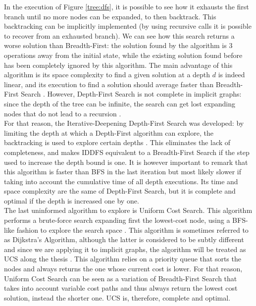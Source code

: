 In the execution of Figure \ref{tree:dfs}, it is possible to see how it
exhausts the first branch until no more nodes can be expanded, to then
backtrack. This backtracking can be implicitly implemented (by using recursive
calls it is possible to recover from an exhausted branch). We can see how this
search returns a worse solution than Breadth-First: the solution found by the
algorithm is 3 operations away from the initial state, while the existing
solution found before has been completely ignored by this algorithm. The main
advantage of this algorithm is its space complexity to find a given solution at
a depth $d$ is indeed linear, and its execution to find a solution should
average faster than Breadth-First Search \cite{zhang-1995-bnb}. However,
Depth-First Search is not complete in implicit graphs: since the depth of the
tree can be infinite, the search can get lost expanding nodes that do not lead
to a recursion \cite{rusell-2003-aima}.\\

For that reason, the Iterative-Deepening Depth-First Search was developed: by
limiting the depth at which a Depth-First algorithm can explore, the
backtracking is used to explore certain depths \cite{rusell-2003-aima}. This
eliminates the lack of completeness, and makes IDDFS equivalent to a
Breadth-First Search if the step used to increase the depth bound is one. It is
however important to remark that this algorithm is faster than BFS in the last
iteration but most likely slower if taking into account the cumulative time of
all depth executions. Its time and space complexity are the same of Depth-First
Search, but it is complete and optimal if the depth is increased one by one.\\

The last uninformed algorithm to explore is Uniform Cost Search. This algorithm
performs a brute-force search expanding first the lowest-cost node, using a
BFS-like fashion to explore the search space \cite{rusell-2003-aima}. This
algorithm is sometimes referred to as Dijkstra's Algorithm, although the latter
is considered to be subtly different and since we are applying it to implicit
graphs, the algorithm will be treated as UCS along the thesis
\cite{felner-2011-dijkstra}. This algorithm relies on a priority queue that
sorts the nodes and always returns the one whose current cost is lower. For
that reason, Uniform Cost Search can be seen as a variation of Breadth-First
Search that takes into account variable cost paths and thus always return the
lowest cost solution, instead the shorter one. UCS is, therefore, complete and
optimal.\\

